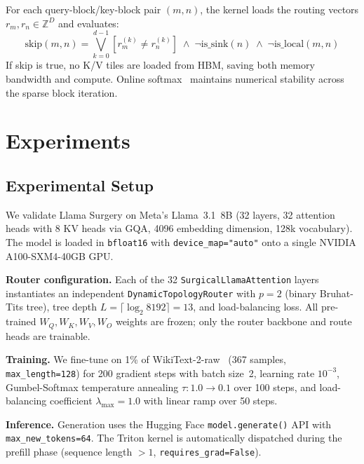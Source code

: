 \documentclass[11pt,a4paper]{article}
\begin{document}
For each query-block/key-block pair $(m, n)$, the kernel loads the routing vectors $r_m, r_n \in \mathbb{Z}^D$ and evaluates:
\begin{equation}
    \text{skip}(m, n) = \bigvee_{k=0}^{d-1} \left[r_m^{(k)} \neq r_n^{(k)}\right] \;\wedge\; \neg\text{is\_sink}(n) \;\wedge\; \neg\text{is\_local}(m, n)
\end{equation}
If skip is true, no K/V tiles are loaded from HBM, saving both memory bandwidth and compute. Online softmax~\citep{milakov2018softmax} maintains numerical stability across the sparse block iteration.

\section{Experiments}

\subsection{Experimental Setup}

We validate Llama Surgery on Meta's Llama~3.1~8B (32 layers, 32 attention heads with 8 KV heads via GQA, 4096 embedding dimension, 128k vocabulary). The model is loaded in \texttt{bfloat16} with \texttt{device\_map="auto"} onto a single NVIDIA A100-SXM4-40GB GPU.

\textbf{Router configuration.} Each of the 32 \texttt{SurgicalLlamaAttention} layers instantiates an independent \texttt{DynamicTopologyRouter} with $p = 2$ (binary Bruhat-Tits tree), tree depth $L = \lceil \log_2 8192 \rceil = 13$, and load-balancing loss. All pre-trained $W_Q, W_K, W_V, W_O$ weights are frozen; only the router backbone and route heads are trainable.

\textbf{Training.} We fine-tune on 1\% of WikiText-2-raw~\citep{merity2017pointer} (367 samples, \texttt{max\_length=128}) for 200 gradient steps with batch size~2, learning rate $10^{-3}$, Gumbel-Softmax temperature annealing $\tau: 1.0 \to 0.1$ over 100 steps, and load-balancing coefficient $\lambda_{\max} = 1.0$ with linear ramp over 50 steps.

\textbf{Inference.} Generation uses the Hugging Face \texttt{model.generate()} API with \texttt{max\_new\_tokens=64}. The Triton kernel is automatically dispatched during the prefill phase (sequence length $> 1$, \texttt{requires\_grad=False}).
\end{document}
